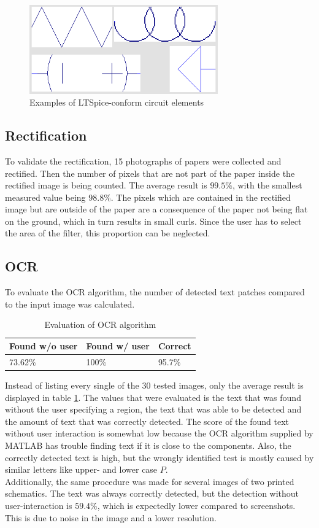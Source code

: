\documentclass[10pt,twocolumn,letterpaper]{article}
\begin{document}
\begin{figure}[!ht]
\includegraphics[width = 3.2in]{img/elements.png}
\caption{Examples of LTSpice-conform circuit elements}
\label{fig:c4}
\end{figure}

\subsection{Rectification}

To validate the rectification, 15 photographs of papers were collected and rectified. Then the number of pixels that are not part of the paper inside the rectified image is being counted. The average result is $99.5\%$, with the smallest measured value being $98.8\%$. The pixels which are contained in the rectified image but are outside of the paper are a consequence of the paper not being flat on the ground, which in turn results in small curls. Since the user has to select the area of the filter, this proportion can be neglected.

\subsection{OCR}

To evaluate the OCR algorithm, the number of detected text patches compared to the input image was calculated. 

\begin{table}[!ht]
\centering
\caption{Evaluation of OCR algorithm}
\label{tab:ocr}
\begin{tabular}{|l|l|l|}
\hline
Found w/o user & Found w/ user & Correct \\ \hline
73.62\%        & 100\%         & 95.7\%  \\ \hline
\end{tabular}
\end{table}

Instead of listing every single of the 30 tested images, only the average result is displayed in table \ref{tab:ocr}. The values that were evaluated is the text that was found without the user specifying a region, the text that was able to be detected and the amount of text that was correctly detected. The score of the found text without user interaction is somewhat low because the OCR algorithm supplied by MATLAB has trouble finding text if it is close to the components. Also, the correctly detected text is high, but the wrongly identified test is mostly caused by similar letters like upper- and lower case $P$.\\
Additionally, the same procedure was made for several images of two printed schematics. The text was always correctly detected, but the detection without user-interaction is $59.4\%$, which is expectedly lower compared to screenshots. This is due to noise in the image and a lower resolution.
\end{document}
